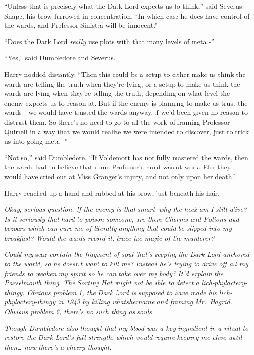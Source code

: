 ``Unless that is precisely what the Dark Lord expects us to think,''
said Severus Snape, his brow furrowed in concentration. ``In which case
he does have control of the wards, and Professor Sinistra will be
innocent.''

``Does the Dark Lord \emph{really} use plots with that many levels of
meta -''

``Yes,'' said Dumbledore and Severus.

Harry nodded distantly. ``Then this could be a setup to either make us
think the wards are telling the truth when they're lying, or a setup to
make us think the wards are lying when they're telling the truth,
depending on what level the enemy expects us to reason at. But if the
enemy is planning to make us trust the wards - we would have trusted the
wards anyway, if we'd been given no reason to distrust them. So there's
no need to go to all the work of framing Professor Quirrell in a way
that we would realize we were intended to discover, just to trick us
into going meta -''

``Not so,'' said Dumbledore. ``If Voldemort has not fully mastered the
wards, then the wards had to believe that some Professor's hand was at
work. Else they would have cried out at Miss Granger's injury, and not
only upon her death.''

Harry reached up a hand and rubbed at his brow, just beneath his hair.

\emph{Okay, serious question. If the enemy is that smart, why the heck
am I still alive? Is it seriously that hard to poison someone, are there
Charms and Potions and bezoars which can cure me of literally anything
that could be slipped into my breakfast?} \emph{Would the wards record
it, trace the magic of the murderer?}

\emph{Could my} scar \emph{contain the fragment of soul that's keeping
the Dark Lord anchored to the world, so he doesn't want to kill me?
Instead he's trying to drive off all my friends to weaken my spirit so
he can take over my body? It'd explain the Parselmouth thing. The
Sorting Hat might not be able to detect a lich-phylactery-thingy.
Obvious problem 1, the Dark Lord is supposed to have made his
lich-phylactery-thingy in 1943 by killing whatshername and framing
Mr.~Hagrid. Obvious problem 2, there's no such thing as souls.}

\emph{Though Dumbledore also thought that my blood was a key ingredient
in a ritual to restore the Dark Lord's full strength, which would
require keeping me alive until then\ldots{} now there's a cheery
thought.}

